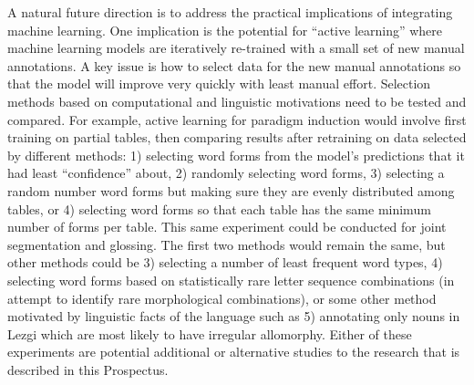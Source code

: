A natural future direction is to address the practical implications of integrating machine learning. One implication is the potential for ``active learning'' where machine learning models are iteratively re-trained with a small set of new manual annotations. A key issue is how to select data for the new manual annotations so that the model will improve very quickly with least manual effort. Selection methods based on computational and linguistic motivations need to be tested and compared. For example, active learning for paradigm induction would involve first training on partial tables, then comparing results after retraining on data selected by different methods: 1) selecting word forms from the model’s predictions that it had least ``confidence'' about, 2) randomly selecting word forms, 3) selecting a random number word forms but making sure they are evenly distributed among tables, or 4) selecting word forms so that each table has the same minimum number of forms per table. This same experiment could be conducted for joint segmentation and glossing. The first two methods would remain the same, but other methods could be 3) selecting a number of least frequent word types, 4) selecting word forms based on statistically rare letter sequence combinations (in attempt to identify rare morphological combinations), or some other method motivated by linguistic facts of the language such as 5) annotating only nouns in Lezgi which are most likely to have irregular allomorphy. Either of these experiments are potential additional or alternative studies to the research that is described in this Prospectus.
